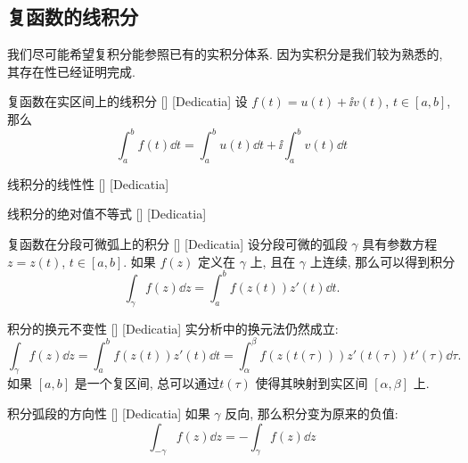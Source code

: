 \documentclass[UTF8]{ctexart}
\begin{document}
    \subsection{复函数的线积分}
    
        我们尽可能希望复积分能参照已有的实积分体系. 因为实积分是我们较为熟悉的, 其存在性已经证明完成. 
        
        \begin{dfn}
            [UUID]
            {复函数在实区间上的线积分}
            []
            [Dedicatia]
            设 \(f(t)=u(t)+\ii v(t)\),  \(t\in[a,b]\), 那么
            \[\int_{a}^{b}f(t)\dd{t}=\int_{a}^{b}u(t)\dd{t}+\ii\int_{a}^{b}v(t)\dd{t}\]
        \end{dfn}
        
        \begin{ppt}
            [UUID]
            {线积分的线性性}
            []
            [Dedicatia]
        \end{ppt}

        \begin{ppt}
            [UUID]
            {线积分的绝对值不等式}
            []
            [Dedicatia]
        \end{ppt}

        \begin{crl}
            [UUID]
            {复函数在分段可微弧上的积分}
            []
            [Dedicatia]
            设分段可微的弧段 \(\gamma\) 具有参数方程 \(z=z(t)\),  \(t\in[a,b]\). 如果 \(f(z)\) 定义在 \(\gamma\) 上, 且在 \(\gamma\) 上连续, 那么可以得到积分
            \[\int_\gamma f(z)\dd{z}=\int_{a}^{b}f(z(t))z'(t)\dd{t}.\]
        \end{crl}

        \begin{ppt}
            [UUID]
            {积分的换元不变性}
            []
            [Dedicatia]
            实分析中的换元法仍然成立: 
            \[\int_\gamma f(z)\dd{z}=\int_{a}^{b}f(z(t))z'(t)\dd{t}=\int_{\alpha}^{\beta}f(z(t(\tau)))z'(t(\tau))t'(\tau)\dd{\tau}.\]
            如果 \([a,b]\) 是一个复区间, 总可以通过\ConformalMapping  \(t(\tau)\) 使得其映射到实区间 \([\alpha,\beta]\) 上. 
        \end{ppt}

        \begin{ppt}
            [UUID]
            {积分弧段的方向性}
            []
            [Dedicatia]
            如果 \(\gamma\) 反向, 那么积分变为原来的负值: 
            \[\int_{-\gamma} f(z)\dd{z}=-\int_\gamma f(z)\dd{z}\]
        \end{ppt}
\end{document}
